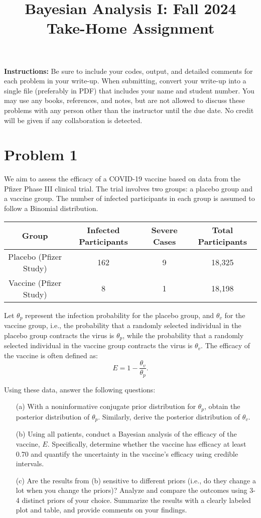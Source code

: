 \documentclass{article}
\title{Bayesian Analysis I: Fall 2024 Take-Home Assignment}
\author{}
\date{}
\begin{document}
\maketitle

\noindent\textbf{Instructions:}  
Be sure to include your codes, output, and detailed comments for each problem in your write-up. When submitting, convert your write-up into a single file (preferably in PDF) that includes your name and student number. You may use any books, references, and notes, but are not allowed to discuss these problems with any person other than the instructor until the due date. No credit will be given if any collaboration is detected.

\section*{Problem 1}
We aim to assess the efficacy of a COVID-19 vaccine based on data from the Pfizer Phase III clinical trial. The trial involves two groups: a placebo group and a vaccine group. The number of infected participants in each group is assumed to follow a Binomial distribution.

\begin{center}
\begin{tabular}{|c|c|c|c|}
\hline
\textbf{Group} & \textbf{Infected Participants} & \textbf{Severe Cases} & \textbf{Total Participants} \\
\hline
Placebo (Pfizer Study) & 162 & 9 & 18,325 \\
Vaccine (Pfizer Study) & 8 & 1 & 18,198 \\
\hline
\end{tabular}
\end{center}

Let $\theta_p$ represent the infection probability for the placebo group, and $\theta_v$ for the vaccine group, i.e., the probability that a randomly selected individual in the placebo group contracts the virus is $\theta_p$, while the probability that a randomly selected individual in the vaccine group contracts the virus is $\theta_v$. The efficacy of the vaccine is often defined as:
\[
E = 1 - \frac{\theta_v}{\theta_p}.
\]

Using these data, answer the following questions:
\begin{enumerate}
    \item[(a)] With a noninformative conjugate prior distribution for $\theta_p$, obtain the posterior distribution of $\theta_p$. Similarly, derive the posterior distribution of $\theta_v$.
    \item[(b)] Using all patients, conduct a Bayesian analysis of the efficacy of the vaccine, $E$. Specifically, determine whether the vaccine has efficacy at least 0.70 and quantify the uncertainty in the vaccine's efficacy using credible intervals.
    \item[(c)] Are the results from (b) sensitive to different priors (i.e., do they change a lot when you change the priors)? Analyze and compare the outcomes using 3-4 distinct priors of your choice. Summarize the results with a clearly labeled plot and table, and provide comments on your findings.
\end{enumerate}
\end{document}
